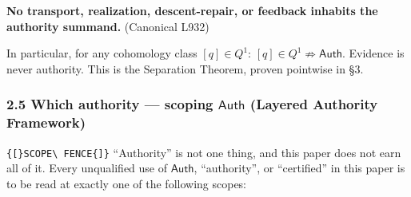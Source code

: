 \documentclass[
  10pt,
]{article}
\renewenvironment{quote}
  {\begin{leftbar}\small}
  {\end{leftbar}}
\DeclareRobustCommand{\texttt}[1]{{\paperSymbolFont\nolinkurl{#1}}}
\begin{document}
\begin{quote}
\textbf{No transport, realization, descent-repair, or feedback inhabits the authority summand.} (Canonical L932)
\end{quote}

In particular, for any cohomology class \protect\hypertarget{math-E0017-0050}{}{\([q] \in Q^1\)}: \protect\hypertarget{math-E0009-0051}{}{\([q] \in Q^1 \not\Rightarrow \mathsf{Auth}\)}. Evidence is never authority. This is the Separation Theorem, proven pointwise in §3.

\subsubsection[2.5 Which authority --- scoping (Layered Authority Framework)]{\texorpdfstring{2.5 Which authority --- scoping \protect\hypertarget{math-E0039-0052}{}{\(\mathsf{Auth}\)} (Layered Authority Framework)}{2.5 Which authority --- scoping \textbackslash mathsf\{Auth\} (Layered Authority Framework)}}\label{which-authority-scoping-mathsfauth-layered-authority-framework}

\texttt{{[}SCOPE\ FENCE{]}} ``Authority'' is not one thing, and this paper does not earn all of it. Every unqualified use of \protect\hypertarget{math-E0039-0053}{}{\(\mathsf{Auth}\)}, ``authority'', or ``certified'' in this paper is to be read at exactly one of the following scopes:
\end{document}
